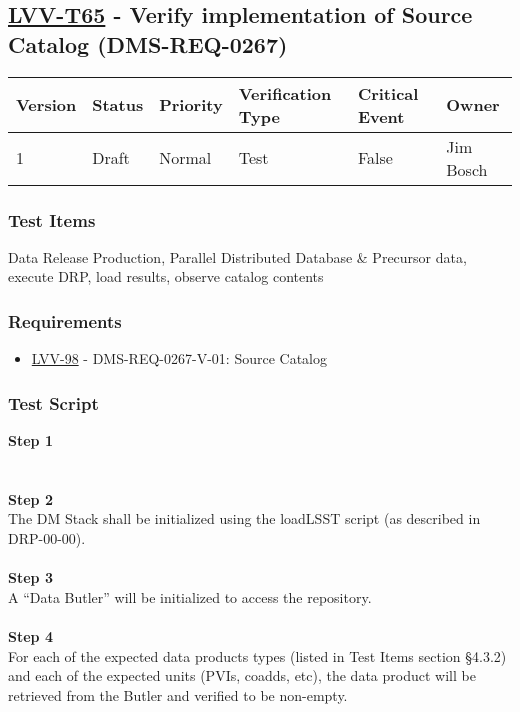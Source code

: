 \hypertarget{lvv-t65---verify-implementation-of-source-catalog-dms-req-0267}{%
\subsection{\texorpdfstring{\href{https://jira.lsstcorp.org/secure/Tests.jspa\#/testCase/LVV-T65}{LVV-T65}
- Verify implementation of Source Catalog
(DMS-REQ-0267)}{LVV-T65 - Verify implementation of Source Catalog (DMS-REQ-0267)}}\label{lvv-t65---verify-implementation-of-source-catalog-dms-req-0267}}

\begin{longtable}[]{@{}llllll@{}}
\toprule
Version & Status & Priority & Verification Type & Critical Event &
Owner\tabularnewline
\midrule
\endhead
1 & Draft & Normal & Test & False & Jim Bosch\tabularnewline
\bottomrule
\end{longtable}

\hypertarget{test-items-154}{%
\subsubsection{Test Items}\label{test-items-154}}

Data Release Production, Parallel Distributed Database \& Precursor
data, execute DRP, load results, observe catalog contents

\hypertarget{requirements-155}{%
\subsubsection{Requirements}\label{requirements-155}}

\begin{itemize}
\tightlist
\item
  \href{https://jira.lsstcorp.org/browse/LVV-98}{LVV-98} -
  DMS-REQ-0267-V-01: Source Catalog
\end{itemize}

\hypertarget{test-script-155}{%
\subsubsection{Test Script}\label{test-script-155}}

\textbf{Step 1}\\
~\\
~\\
\textbf{Step 2}\\
The DM Stack shall be initialized using the loadLSST script (as
described in DRP-00-00).\\
~\\
\textbf{Step 3}\\
A ``Data Butler'' will be initialized to access the repository.\\
~\\
\textbf{Step 4}\\
For each of the expected data products types (listed in Test Items
section §4.3.2) and each of the expected units (PVIs, coadds, etc), the
data product will be retrieved from the Butler and verified to be
non-empty.\\
~\\
~\\
~\\

